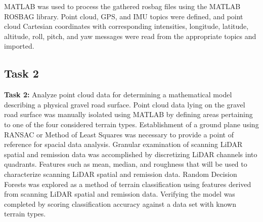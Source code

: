 \documentclass[numbered,pdftex]{ohio-etd}
\begin{document}
{{{{				{MATLAB was used to process the gathered rosbag files using the MATLAB ROSBAG library. Point cloud, GPS, and IMU topics were defined, and point cloud Cartesian coordinates with corresponding intensities, longitude, latitude, altitude, roll, pitch, and yaw messages were read from the appropriate topics and imported.}
		
			} %
				
		} %

		\subsection{Task 2}{

			\textbf{Task 2: }{Analyze point cloud data for determining a mathematical model describing a physical gravel road surface. Point cloud data lying on the gravel road surface was manually isolated using MATLAB by defining areas pertaining to one of the four considered terrain types. Establishment of a ground plane using RANSAC or Method of Least Squares was necessary to provide a point of reference for spacial data analysis. Granular examination of scanning LiDAR spatial and remission data was accomplished by discretizing LiDAR channels into quadrants. Features such as mean, median, and roughness that will be used to characterize scanning LiDAR spatial and remission data. Random Decision Forests was explored as a method of terrain classification using features derived from scanning LiDAR spatial and remission data. Verifying the model was completed by scoring classification accuracy against a  data set with known terrain types.}
			
%				
%			
%			

}}}
\end{document}

